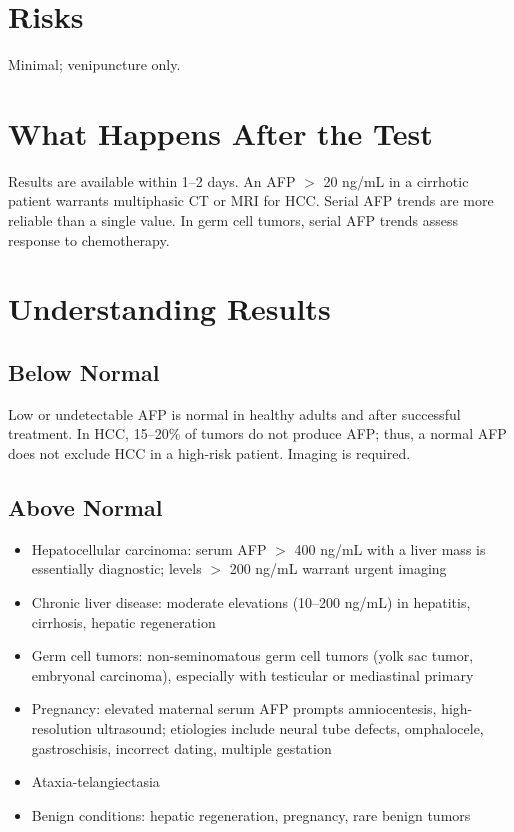 \section*{Risks}
Minimal; venipuncture only.

\section*{What Happens After the Test}
Results are available within 1--2 days. An AFP $>$ 20 ng/mL in a cirrhotic patient warrants multiphasic CT or MRI for HCC. Serial AFP trends are more reliable than a single value. In germ cell tumors, serial AFP trends assess response to chemotherapy.

\section*{Understanding Results}

\subsection*{Below Normal}
Low or undetectable AFP is normal in healthy adults and after successful treatment. In HCC, 15--20\% of tumors do not produce AFP; thus, a normal AFP does not exclude HCC in a high-risk patient. Imaging is required.

\subsection*{Above Normal}
\begin{itemize}
  \item Hepatocellular carcinoma: serum AFP $>$ 400 ng/mL with a liver mass is essentially diagnostic; levels $>$ 200 ng/mL warrant urgent imaging
  \item Chronic liver disease: moderate elevations (10--200 ng/mL) in hepatitis, cirrhosis, hepatic regeneration
  \item Germ cell tumors: non-seminomatous germ cell tumors (yolk sac tumor, embryonal carcinoma), especially with testicular or mediastinal primary
  \item Pregnancy: elevated maternal serum AFP prompts amniocentesis, high-resolution ultrasound; etiologies include neural tube defects, omphalocele, gastroschisis, incorrect dating, multiple gestation
  \item Ataxia-telangiectasia
  \item Benign conditions: hepatic regeneration, pregnancy, rare benign tumors
\end{itemize}

